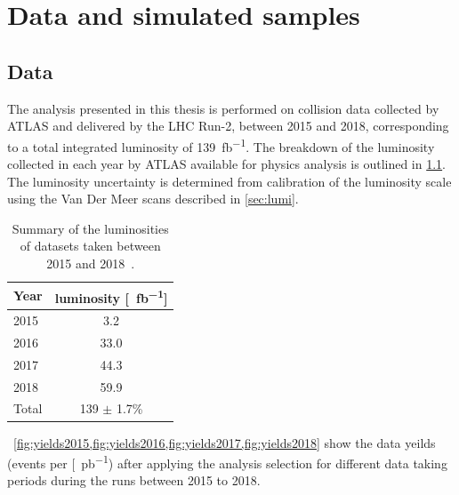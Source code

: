 \chapter{Data and simulated samples}\label{chap:datamc}

\section{Data}
The analysis presented in this thesis is performed on \emph{\protonproton} collision data collected by ATLAS and delivered by the LHC Run-2, between 2015 and 2018, corresponding to a total integrated luminosity of \SI{139}{\femto\barn^{-1}}. The breakdown of the luminosity collected in each year by ATLAS available for physics analysis is outlined in \cref{tab:data:lumi}. The luminosity uncertainty is determined from calibration of the luminosity scale using the Van Der Meer scans described in \cref{sec:lumi}. 
\begin{table}[h]
    \centering
    \begin{tabular}{l|c}
        Year & luminosity [\SI{}{\femto\barn^{-1}}] \\
        \hline
        2015 & 3.2 \\
        2016 & 33.0 \\
        2017 & 44.3 \\
        2018 & 59.9 \\
        \hline 
        \hline
        Total & 139 $\pm$ 1.7\% \\
	\end{tabular}
    \caption[Summary of the luminosities of datasets taken between 2015 and 2018]{Summary of the luminosities of datasets taken between 2015 and 2018~\cite{ATLAS:lumiPlots}.}
    \label{tab:data:lumi}
  \end{table}

~\cref{fig:yields2015,fig:yields2016,fig:yields2017,fig:yields2018} show the data yeilds (events per [\SI{}{\pico\barn^{-1}}) after applying the analysis selection for different data taking periods during the runs between 2015 to 2018. 

